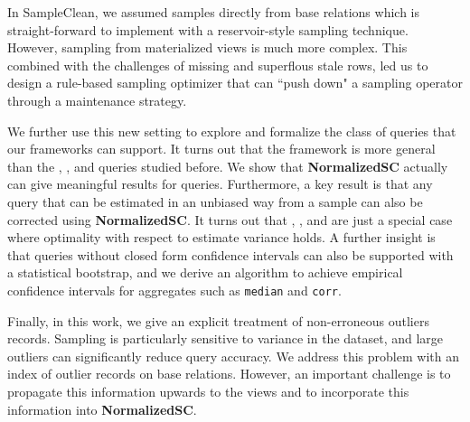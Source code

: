 In SampleClean, we assumed samples directly from base relations which is straight-forward to implement with a reservoir-style sampling technique.
However, sampling from materialized views is much more complex.
This combined with the challenges of missing and superflous stale rows, led us to design a rule-based sampling optimizer that can ``push down" a sampling operator through a maintenance strategy.

We further use this new setting to explore and formalize the class of queries that our frameworks can support.
It turns out that the framework is more general than the \sumfunc, \avgfunc, and \countfunc queries studied before.
We show that \textbf{NormalizedSC} actually can give meaningful results for \selectfunc queries.
Furthermore, a key result is that any query that can be estimated in an unbiased way from a sample can also be corrected using \textbf{NormalizedSC}.
It turns out that \sumfunc, \avgfunc, and \countfunc are just a special case where optimality with respect to estimate variance holds.
A further insight is that queries without closed form confidence intervals can also be supported with a statistical bootstrap, and we
derive an algorithm to achieve empirical confidence intervals for aggregates such as \texttt{median} and \texttt{corr}.

Finally, in this work, we give an explicit treatment of non-erroneous outliers records.
Sampling is particularly sensitive to variance in the dataset, and large outliers can significantly reduce query accuracy.
We address this problem with an index of outlier records on base relations.
However, an important challenge is to propagate this information upwards to the views and to incorporate this information into \textbf{NormalizedSC}.





